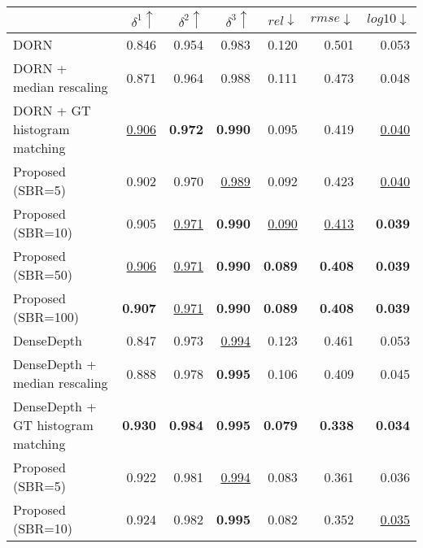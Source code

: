 \begin{tabular}{lrrr|rrr}
\toprule
{} & $\delta^1 \uparrow$ & $\delta^2 \uparrow$ & $\delta^3 \uparrow$ &   $rel \downarrow$ &  $rmse \downarrow$ & $log10 \downarrow$ \\
\midrule
DORN                               &               0.846 &               0.954 &               0.983 &              0.120 &              0.501 &              0.053 \\
DORN + median rescaling            &               0.871 &               0.964 &               0.988 &              0.111 &              0.473 &              0.048 \\
DORN + GT histogram matching       &   \underline{0.906} &      \textbf{0.972} &      \textbf{0.990} &              0.095 &              0.419 &  \underline{0.040} \\
Proposed (SBR=5)                   &               0.902 &               0.970 &   \underline{0.989} &              0.092 &              0.423 &  \underline{0.040} \\
Proposed (SBR=10)                  &               0.905 &   \underline{0.971} &      \textbf{0.990} &  \underline{0.090} &  \underline{0.413} &     \textbf{0.039} \\
Proposed (SBR=50)                  &   \underline{0.906} &   \underline{0.971} &      \textbf{0.990} &     \textbf{0.089} &     \textbf{0.408} &     \textbf{0.039} \\
Proposed (SBR=100)                 &      \textbf{0.907} &   \underline{0.971} &      \textbf{0.990} &     \textbf{0.089} &     \textbf{0.408} &     \textbf{0.039} \\
\midrule
DenseDepth                         &               0.847 &               0.973 &   \underline{0.994} &              0.123 &              0.461 &              0.053 \\
DenseDepth + median rescaling      &               0.888 &               0.978 &      \textbf{0.995} &              0.106 &              0.409 &              0.045 \\
DenseDepth + GT histogram matching &      \textbf{0.930} &      \textbf{0.984} &      \textbf{0.995} &     \textbf{0.079} &     \textbf{0.338} &     \textbf{0.034} \\
Proposed (SBR=5)                   &               0.922 &               0.981 &   \underline{0.994} &              0.083 &              0.361 &              0.036 \\
Proposed (SBR=10)                  &               0.924 &               0.982 &      \textbf{0.995} &              0.082 &              0.352 &  \underline{0.035} \\

\end{tabular}
